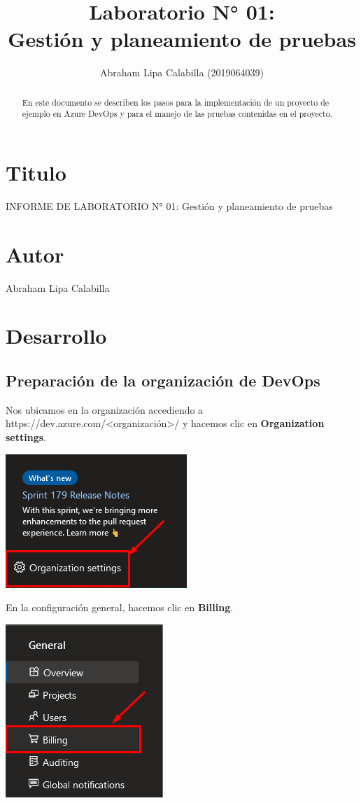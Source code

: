 \documentclass{elsarticle}
\begin{document}
	
\begin{frontmatter}
    \title
    {
        \huge Laboratorio N° 01: \\
        Gestión y planeamiento de pruebas
    }
    \author{Abraham Lipa Calabilla (2019064039)}
    \address{Tacna, Perú}
    \begin{abstract}
        En este documento se describen los pasos para la implementación de un proyecto de ejemplo en Azure DevOps y para el manejo de las pruebas contenidas en el proyecto.
    \end{abstract}
\end{frontmatter}

\section{Titulo}
INFORME DE LABORATORIO N° 01: Gestión y planeamiento de pruebas

\section{Autor}
Abraham Lipa Calabilla

\section{Desarrollo}

\subsection{Preparación de la organización de DevOps}

Nos ubicamos en la organización accediendo a https://dev.azure.com/<organización>/ y hacemos clic en \textbf{Organization settings}.
\begin{center}
	\includegraphics{img/Screenshot_1.png}
\end{center}

En la configuración general, hacemos clic en \textbf{Billing}.
\begin{center}
	\includegraphics{img/Screenshot_2.png}
\end{center}
\end{document}

